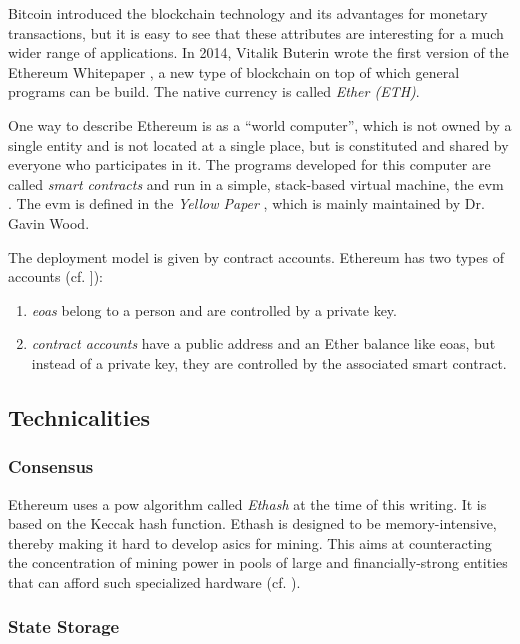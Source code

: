 Bitcoin introduced the blockchain technology and its advantages for
monetary transactions, but it is easy to see that these attributes
are interesting for a much wider range of applications.
In 2014, Vitalik Buterin wrote the first version of the Ethereum
Whitepaper \cite{Buterin14}, a new type of blockchain on top of which
general programs can be build.
The native currency is called \emph{Ether (ETH)}. 

One way to describe Ethereum is as a ``world computer'', which is
not owned by a single entity and is not located at a single place,
but is constituted and shared by everyone who participates in it.
The programs developed for this computer are called \emph{smart contracts} and run in a simple, stack-based virtual
machine, the \ac{evm} \nocite{Saini18}.
The \ac{evm} is defined in the {\em Yellow Paper} \cite{Wood18}, which is mainly maintained by Dr. Gavin Wood.

The deployment model is given by contract accounts.
Ethereum has two types of accounts (cf. \cite{Kenneth18}]):

\begin{enumerate}
\item {\em \acp{eoa}} belong to a person and are controlled by a private key.
\item {\em contract accounts} have a public address and an Ether balance like
  \acp{eoa}, but instead of a private key, they are controlled by the associated smart contract.
\end{enumerate}

\subsection{Technicalities}

\subsubsection{Consensus}
Ethereum uses a \ac{pow} algorithm called \emph{Ethash} at the time of this writing.
It is based on the Keccak hash function.
Ethash is designed to be memory-intensive, thereby making it hard to develop \acp{asic} for mining.
This aims at counteracting the concentration of mining power in pools of large and financially-strong entities
that can afford such specialized hardware (cf. \cite{Buterin2013}).

\subsubsection{State Storage}

